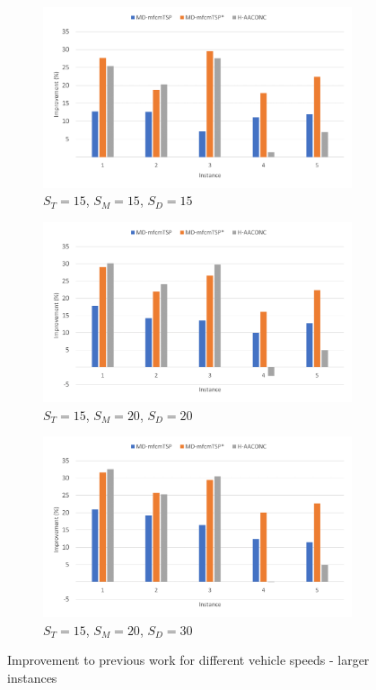 \documentclass{article}
\begin{document}
	\begin{figure}[h]
		\centering
		\begin{subfigure}{0.33\textwidth}
			\centering
			\includegraphics[scale=0.42]{large_15-15-15}\;
			\caption{$S_T=15$, $S_M=15$, $S_D=15$}
			\label{fig:large_15-15-15}
		\end{subfigure}
		\begin{subfigure}{0.33\textwidth}
			\centering
			\includegraphics[scale=0.42]{large_15-20-20}\;
			\caption{$S_T=15$, $S_M=20$, $S_D=20$}
			\label{fig:large_15-20-20}
		\end{subfigure}
		\begin{subfigure}{0.33\textwidth}
			\centering
			\includegraphics[scale=0.42]{large_15-20-30}\;
			\caption{$S_T=15$, $S_M=20$, $S_D=30$}
			\label{fig:large_15-20-30}
		\end{subfigure}
		\caption{Improvement to previous work for different vehicle speeds - larger instances}
		\label{fig:large_instances}
	\end{figure}
	
\end{document}
